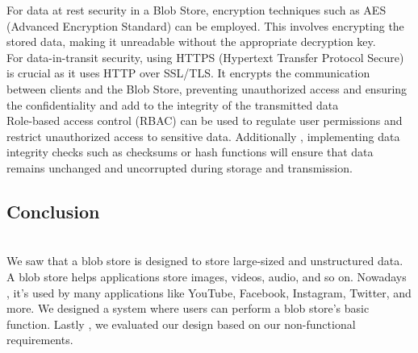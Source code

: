 For data at rest security in a Blob Store, encryption techniques such as AES (Advanced Encryption Standard) can be employed. This involves encrypting the stored data, making it unreadable without the appropriate decryption key.
\\
For data-in-transit security, using HTTPS (Hypertext Transfer Protocol Secure) is crucial as it uses HTTP over SSL/TLS. It encrypts the communication between clients and the Blob Store, preventing unauthorized access and ensuring the confidentiality and add to the integrity of the transmitted data
\\
Role-based access control (RBAC) can be used to regulate user permissions and restrict unauthorized access to sensitive data. Additionally , implementing data integrity checks such as checksums or hash functions will ensure that data remains unchanged and uncorrupted during storage and transmission.

\subsection{Conclusion}\label{NSrQhHWFjBArmIPQxI7ew}
\\
We saw that a blob store is designed to store large-sized and unstructured data. A blob store helps applications store images, videos, audio, and so on. Nowadays , it's used by many applications like YouTube, Facebook, Instagram, Twitter, and more. We designed a system where users can perform a blob store's basic function. Lastly
, we evaluated our design based on our non-functional requirements.

